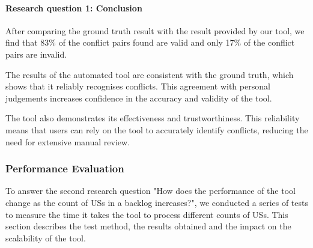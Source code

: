 \paragraph{Research question 1: Conclusion}
After comparing the ground truth result with the result provided by our tool, we find that 83\% of the conflict pairs found are valid and only 17\% of the conflict pairs are invalid.

The results of the automated tool are consistent with the ground truth, which shows that it reliably recognises conflicts. This agreement with personal judgements increases confidence in the accuracy and validity of the tool. 

The tool also demonstrates its effectiveness and trustworthiness. This reliability means that users can rely on the tool to accurately identify conflicts, reducing the need for extensive manual review. 
\subsubsection*{Performance Evaluation}
To answer the second research question "How does the performance of the tool change as the count of USs in a backlog increases?", we conducted a series of tests to measure the time it takes the tool to process different counts of USs. This section describes the test method, the results obtained and the impact on the scalability of the tool.
